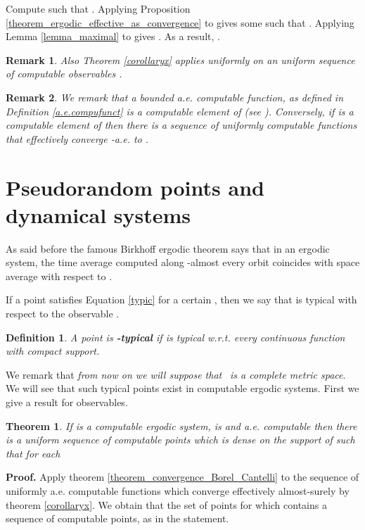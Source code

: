 \documentclass[copyright,creativecommons]{eptcs}
\newtheorem{theorem}{Theorem}
\newtheorem{definition}{Definition}
\newtheorem{remark}{Remark}
\numberwithin{equation}{section}
\begin{document}
Compute  such that .
Applying Proposition \ref{theorem_ergodic_effective_as_convergence} to  gives some  such that . Applying Lemma \ref {lemma_maximal} to  gives . As a
result, .

\begin{remark}
\label{remarkboundunif2} Also Theorem \ref{corollaryx} applies uniformly on
an uniform sequence of computable  observables .
\end{remark}

\begin{remark}
\label{remarkcompuL1} We remark that a bounded a.e. computable function, as
defined in Definition \ref{a.e.compufunct} is a computable element of  (see \cite{HoyRojCiE09}). Conversely, if  is a computable
element of  then there is a sequence of uniformly computable
functions  that effectively converge -a.e. to .
\end{remark}

\section{Pseudorandom points and dynamical systems}

As said before the famous Birkhoff ergodic theorem says that in an ergodic
system, the time average computed along -almost every orbit coincides
with space average with respect to .

If a point  satisfies Equation \ref{typic} for a certain , then we say
that  is typical with respect to the observable .

\begin{definition}
\label{mutyp}A point  is \textbf{\emph{-typical}} if 
is typical w.r.t. every continuous function  with compact
support.
\end{definition}

We remark that \emph{from now on we will suppose that }\emph{\ is a
complete metric space}. We will see that such typical points exist in
computable ergodic systems. First we give a result for  observables.

\begin{theorem}
\label{thm1}If  is a computable ergodic system,  is  and a.e. computable then there is a uniform sequence 
of computable points which is dense on the support of  such that for
each 

\end{theorem}

{\bf Proof.}
Apply theorem \ref{theorem_convergence_Borel_Cantelli} to the sequence of
uniformly a.e. computable functions  which
converge effectively almost-surely by theorem \ref{corollaryx}. We obtain
that the set of points for which  contains a sequence of computable points, as
in the statement.
\end{document}
